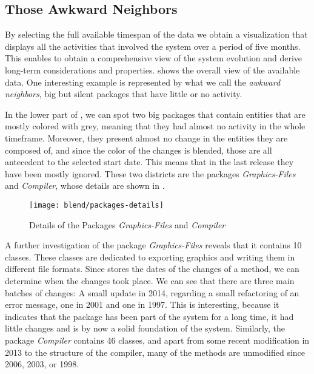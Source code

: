\subsection{Those Awkward Neighbors}

By selecting the full available timespan of the data we obtain a visualization that displays all the activities that involved the \pha system over a period of five months. This enables to obtain a comprehensive view of the system evolution and derive long-term considerations and properties.  shows the overall view of the available data. One interesting example is represented by what we call the \emph{awkward neighbors}, \ie big but silent packages that have little or no activity.

In the lower part of , we can spot two big packages that contain entities that are mostly colored with grey, meaning that they had almost no activity in the whole timeframe. Moreover, they present almost no change in the entities they are composed of, and since the color of the changes is blended, those are all antecedent to the selected start date. This means that in the last release they have been mostly ignored. These two districts are the packages \textit{Graphics-Files} and \textit{Compiler}, whose details are shown in .

\begin{figure}[ht]
\centering
\texttt{[image: blend/packages-details]}
\caption{Details of the Packages \textit{Graphics-Files} and \textit{Compiler}}
\label{fig:packages-details}
\end{figure}

A further investigation of the package \textit{Graphics-Files} reveals that it contains 10 classes. These classes are dedicated to exporting graphics and writing them in different file formats. Since \pha stores the dates of the changes of a method, we can determine when the changes took place. We can see that there are three main batches of changes: A small update in 2014, regarding a small refactoring of an error message, one in 2001 and one in 1997. This is interesting, because it indicates that the package has been part of the system for a long time, it had little changes and is by now a solid foundation of the system. Similarly, the package \textit{Compiler} contains 46 classes, and apart from some recent modification in 2013 to the structure of the compiler, many of the methods are unmodified since 2006, 2003, or 1998.


